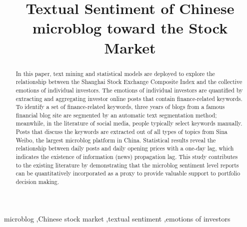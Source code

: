 \documentclass[review,3p,times,12pt,number]{elsarticle}
\begin{document}
\begin{frontmatter}

\title{Textual Sentiment of Chinese microblog toward the Stock Market}
%
%
%
%

\begin{abstract}
In this paper, text mining and statistical models are deployed to explore the relationship between the Shanghai Stock Exchange Composite
Index and the collective emotions of individual investors.
The emotions of individual investors are quantified by extracting and aggregating investor online posts that contain finance-related keywords.
To identify a set of finance-related keywords, three years of blogs from a famous financial blog site are segmented by an automatic text segmentation method; meanwhile, in the literature of social media, people typically select keywords manually.
Posts that discuss the keywords are extracted out of all types of topics from Sina Weibo, the largest microblog platform in China. Statistical results reveal the relationship between daily posts and daily opening prices with a one-day lag, which indicates the existence of information (news) propagation lag. This study contributes to the existing literature by demonstrating that the microblog sentiment level reports can be quantitatively incorporated as a proxy to provide valuable support to portfolio decision making.
\end{abstract}

\begin{keyword}
microblog \sep Chinese stock market \sep textual sentiment \sep emotions of investors
\end{keyword}

\end{frontmatter}
\end{document}
